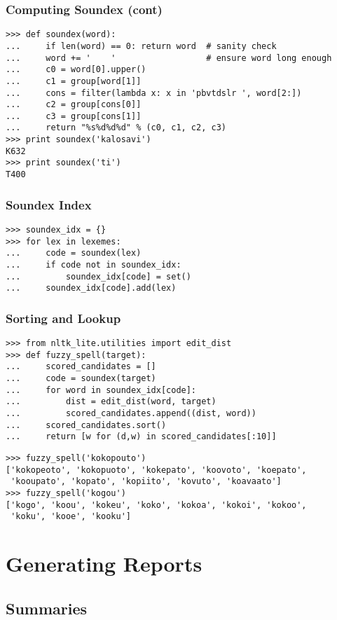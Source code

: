 \documentclass{beamer}             %
\begin{document}
\begin{frame}[fragile]
\frametitle{Computing Soundex (cont)}
\scriptsize

\begin{verbatim}
>>> def soundex(word):
...     if len(word) == 0: return word  # sanity check
...     word += '    '                  # ensure word long enough
...     c0 = word[0].upper()
...     c1 = group[word[1]]
...     cons = filter(lambda x: x in 'pbvtdslr ', word[2:])
...     c2 = group[cons[0]]
...     c3 = group[cons[1]]
...     return "%s%d%d%d" % (c0, c1, c2, c3)
>>> print soundex('kalosavi')
K632
>>> print soundex('ti')
T400
\end{verbatim}
\end{frame}

\begin{frame}[fragile]
\frametitle{Soundex Index}
\begin{verbatim}
>>> soundex_idx = {}
>>> for lex in lexemes:
...     code = soundex(lex)
...     if code not in soundex_idx:
...         soundex_idx[code] = set()
...     soundex_idx[code].add(lex)
\end{verbatim}
\end{frame}

\begin{frame}[fragile]
\frametitle{Sorting and Lookup}
\scriptsize
\begin{verbatim}
>>> from nltk_lite.utilities import edit_dist
>>> def fuzzy_spell(target):
...     scored_candidates = []
...     code = soundex(target)
...     for word in soundex_idx[code]:
...         dist = edit_dist(word, target)
...         scored_candidates.append((dist, word))
...     scored_candidates.sort()
...     return [w for (d,w) in scored_candidates[:10]]
\end{verbatim}

\begin{verbatim}
>>> fuzzy_spell('kokopouto')
['kokopeoto', 'kokopuoto', 'kokepato', 'koovoto', 'koepato',
 'kooupato', 'kopato', 'kopiito', 'kovuto', 'koavaato']
>>> fuzzy_spell('kogou')
['kogo', 'koou', 'kokeu', 'koko', 'kokoa', 'kokoi', 'kokoo',
 'koku', 'kooe', 'kooku']
\end{verbatim}
\end{frame}

\section{Generating Reports}

\subsection{Summaries}
\end{document}
